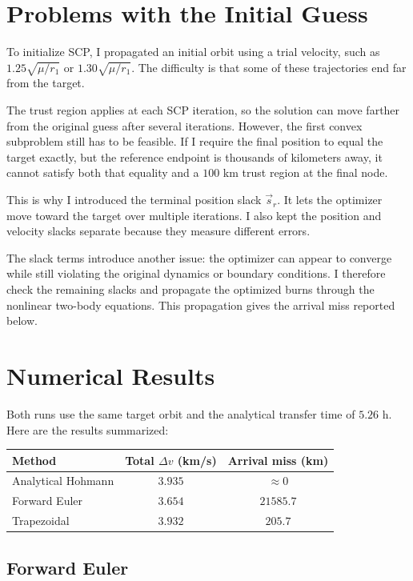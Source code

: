 \documentclass{article}
\begin{document}
\section{Problems with the Initial Guess}

To initialize SCP, I propagated an initial orbit using a trial velocity, such as $1.25\sqrt{\mu/r_1}$ or $1.30\sqrt{\mu/r_1}$. The difficulty is that some of these trajectories end far from the target.

The trust region applies at each SCP iteration, so the solution can move farther from the original guess after several iterations. However, the first convex subproblem still has to be feasible. If I require the final position to equal the target exactly, but the reference endpoint is thousands of kilometers away, it cannot satisfy both that equality and a $100$ km trust region at the final node.

This is why I introduced the terminal position slack $\vec{s}_r$. It lets the optimizer move toward the target over multiple iterations. I also kept the position and velocity slacks separate because they measure different errors.

The slack terms introduce another issue: the optimizer can appear to converge while still violating the original dynamics or boundary conditions. I therefore check the remaining slacks and propagate the optimized burns through the nonlinear two-body equations. This propagation gives the arrival miss reported below.

\section{Numerical Results}

Both runs use the same target orbit and the analytical transfer time of $5.26$ h. Here are the results summarized:

\begin{center}
\begin{tabular}{lcc}
\toprule
Method & Total $\Delta v$ (km/s) & Arrival miss (km)\\
\midrule
Analytical Hohmann & $3.935$ & $\approx 0$\\
Forward Euler & $3.654$ & $21585.7$\\
Trapezoidal & $3.932$ & $205.7$\\
\bottomrule
\end{tabular}
\end{center}

\subsection{Forward Euler}
\end{document}
